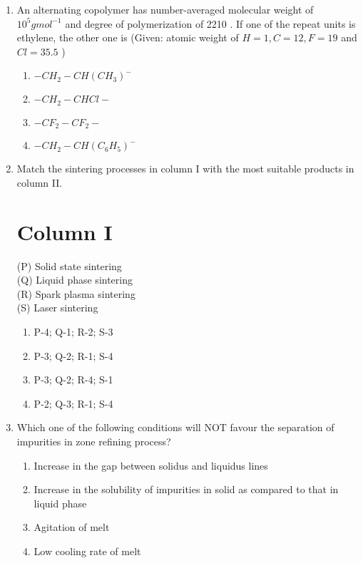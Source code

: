 \documentclass[journal]{IEEEtran}
\begin{document}
\begin{enumerate}
		\setcounter{enumi}{0}
       \item An alternating copolymer has number-averaged molecular weight of $10^{5} g {mol}^{-1}$ and degree of polymerization of 2210 . If one of the repeat units is ethylene, the other one is
(Given: atomic weight of ${H}=1, {C}=12, {F}=19$ and ${Cl}=35.5$ )
        \begin{multicols}{1}
            \begin{enumerate}
                \item $-{CH}_{2}-{CH}\left({CH}_{3}\right)^{-}$
                \item  $-{CH}_{2}-{CHCl}-$
                \item $-{CF}_{2}-{CF}_{2}-$
                \item$-{CH}_{2}-{CH}\left({C}_{6} {H}_{5}\right)^{-}$
            \end{enumerate}
        \end{multicols}


    \item Match the sintering processes in column I with the most suitable products in column II.
    \section*{Column I}
 (P) Solid state sintering\\
(Q) Liquid phase sintering\\
 (R) Spark plasma sintering\\
 (S) Laser sintering\\


		\begin{multicols}{1}
			\begin{enumerate}
	\item P-4; Q-1; R-2; S-3
\item  P-3; Q-2; R-1; S-4
\item P-3; Q-2; R-4; S-1
\item  P-2; Q-3; R-1; S-4
			\end{enumerate}
		\end{multicols}


    \item Which one of the following conditions will NOT favour the separation of impurities in zone refining process?
       
            \begin{enumerate}
             \item  Increase in the gap between solidus and liquidus lines
\item  Increase in the solubility of impurities in solid as compared to that in liquid phase
\item Agitation of melt
\item  Low cooling rate of melt
            \end{enumerate}
       



\end{enumerate}
\end{document}
